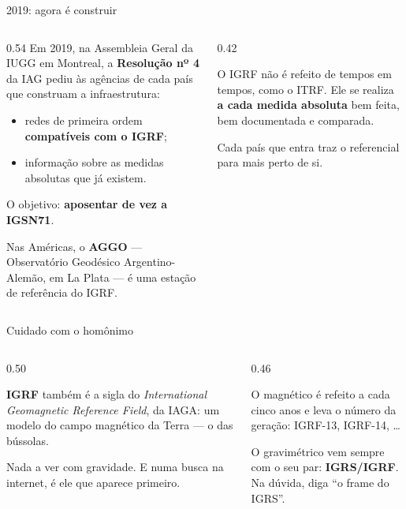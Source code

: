 \documentclass[aspectratio=169,11pt]{beamer}
\newcommand{\bnum}[1]{\textbf{\textcolor{mTeal}{#1}}}
\begin{document}
\begin{frame}{2019: agora é construir}
  \begin{columns}[T]
    \begin{column}{0.54\textwidth}
      Em 2019, na Assembleia Geral da IUGG em Montreal, a \textbf{Resolução nº 4} da IAG
      pediu às agências de cada país que construam a infraestrutura:
      \begin{itemize}
        \item redes de primeira ordem \bnum{compatíveis com o IGRF};
        \item informação sobre as medidas absolutas que já existem.
      \end{itemize}
      O objetivo: \bnum{aposentar de vez a IGSN71}.
      \medskip

      Nas Américas, o \textbf{AGGO} --- Observatório Geodésico Argentino-Alemão, em La
      Plata --- é uma estação de referência do IGRF.
    \end{column}
    \begin{column}{0.42\textwidth}
      \begin{cuidado}[title={Um frame que cresce}]
        O IGRF não é refeito de tempos em tempos, como o ITRF. Ele se realiza \bnum{a cada
        medida absoluta} bem feita, bem documentada e comparada.
        \medskip

        Cada país que entra traz o referencial para mais perto de si.
      \end{cuidado}
    \end{column}
  \end{columns}
\end{frame}

\begin{frame}{Cuidado com o homônimo}
  \begin{columns}[T]
    \begin{column}{0.50\textwidth}
      \begin{armadilha}[title={Existe outro IGRF}]
        \textbf{IGRF} também é a sigla do \emph{International Geomagnetic Reference Field},
        da IAGA: um modelo do \alert{campo magnético} da Terra --- o das bússolas.
        \medskip

        Nada a ver com gravidade. E numa busca na internet, é ele que aparece primeiro.
      \end{armadilha}
    \end{column}
    \begin{column}{0.46\textwidth}
      \begin{ideia}[title={Como não se confundir}]
        O magnético é refeito a cada cinco anos e leva o número da geração: IGRF-13,
        IGRF-14, \ldots
        \medskip

        O gravimétrico vem sempre com o seu par: \bnum{IGRS/IGRF}. Na dúvida, diga ``o frame
        do IGRS''.
      \end{ideia}
    \end{column}
  \end{columns}
\end{frame}
\end{document}
